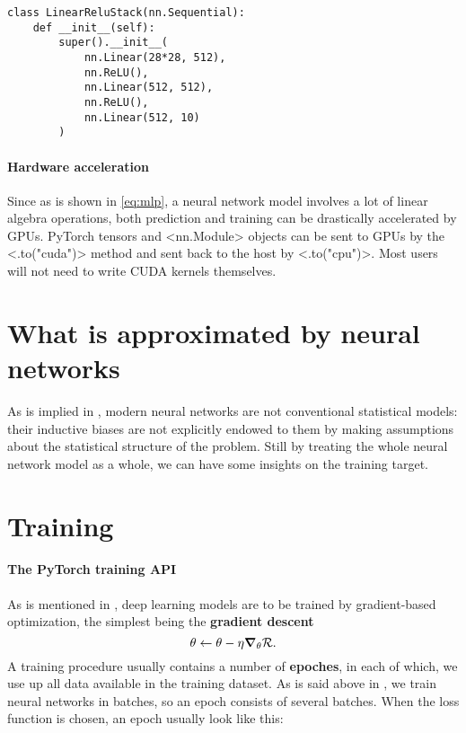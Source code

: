 \documentclass[hyperref, a4paper, 12pt]{report}
\newcommand*{\concept}[1]{{\textbf{#1}}}
\def\texttt#1{<#1>}%
\newcommand{\shortcode}[1]{\texttt{#1}}
\begin{document}
\begin{lstlisting}
class LinearReluStack(nn.Sequential):
    def __init__(self):
        super().__init__(
            nn.Linear(28*28, 512),
            nn.ReLU(),
            nn.Linear(512, 512),
            nn.ReLU(),
            nn.Linear(512, 10)
        )
\end{lstlisting}

\paragraph*{Hardware acceleration}
Since as is shown in \eqref{eq:mlp}, a neural network model involves a lot of linear algebra operations,
both prediction and training can be drastically accelerated by GPUs.
PyTorch tensors and \shortcode{nn.Module} objects can be sent to GPUs
by the \shortcode{.to("cuda")} method and sent back to the host by \shortcode{.to("cpu")}.
Most users will not need to write CUDA kernels themselves.

\section{What is approximated by neural networks}

As is implied in ,
modern neural networks are not conventional statistical models:
their inductive biases are not explicitly endowed to them by making assumptions about the statistical structure of the problem.
Still by treating the whole neural network model as a whole,
we can have some insights on the training target. 



\section{Training}

\paragraph*{The PyTorch training API}
As is mentioned in , deep learning models are to be trained by gradient-based optimization,
the simplest being the \concept{gradient descent}
\begin{equation}
    \theta \leftarrow \theta - \eta \grad_\theta \mathcal{R}.
\end{equation}
A training procedure usually contains a number of \concept{epoches},
in each of which, we use up all data available in the training dataset.
As is said above in , 
we train neural networks in batches, so an epoch consists of several batches.
When the loss function is chosen, 
an epoch usually look like this:
\end{document}
